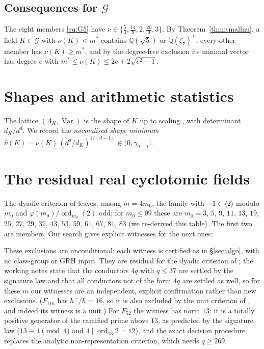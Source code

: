 \documentclass[11pt,reqno]{amsart}
\theoremstyle{plain}
\theoremstyle{definition}
\newcommand{\Q}{\mathbb{Q}}
\newcommand{\Gcl}{\mathcal{G}}
\DeclareMathOperator{\Var}{Var}
\begin{document}
\subsection{Consequences for $\Gcl$}
The eight members \eqref{eq:G5} have $\nu\in\{\frac54,\frac{14}9,2,\frac{20}9,3\}$. By
Theorem~\ref{thm:smallnu}, a field $K\in\Gcl$ with $\nu(K)<m^{*}$ contains $\Q(\sqrt5)$ or
$\Q(\zeta_7)^{+}$; every other member has
$\nu(K)\ge m^{*}$, and by the degree-free exclusion \cite[degree-free exclusion]{PB} its minimal vector has degree
$e$ with $m^{*}\le\nu(K)\le2e+2\sqrt{e^{2}-1}$.

\section{Shapes and arithmetic statistics}\label{sec:stats}

The lattice $(\Lambda_K,\Var)$ is the shape of $K$ up to scaling \cite{MSRG}, with determinant
$d_K/d^{d}$. We record the \emph{normalised shape minimum}
$\hat\nu(K)=\nu(K)\,(d^{d}/d_K)^{1/(d-1)}\in(0,\gamma_{d-1}]$.



\section{The residual real cyclotomic fields}\label{sec:cyclo}

The dyadic criterion of \cite{PD} leaves, among $m=4m_0$, the family with $-1\in\langle2\rangle$
modulo $m_0$ and $\varphi(m_0)/\operatorname{ord}_{m_0}(2)$ odd; for $m_0\le99$ these are
$m_0=3$, $5$, $9$, $11$, $13$, $19$, $25$, $27$, $29$, $37$, $43$, $53$, $59$, $61$, $67$, $81$, $83$
(we re-derived this table). The first two are
members. Our search gives explicit witnesses for the next ones:



These exclusions are unconditional: each witness is certified as in \S\ref{sec:algo}, with no
class-group or GRH input. They are residual for the dyadic criterion of \cite{PD}; the working notes
\cite{PB} state that the conductors $4q$ with $q\le37$ are settled by the signature law and that all
conductors not of the form $4q$ are settled as well, so for these $m$ our witnesses are an
independent, explicit confirmation rather than new exclusions. ($F_{116}$ has $h^{+}/h=16$, so it is
also excluded by the unit criterion of \cite{PB}, and indeed its witness is a unit.) For $F_{52}$ the witness has norm $13$:
it is a totally positive generator of the ramified prime above $13$, as predicted by the signature
law ($13\equiv1\pmod4$ and $4\mid\operatorname{ord}_{13}2=12$), and the exact decision procedure
replaces the analytic non-representation criterion, which needs $q\ge269$.
\end{document}
